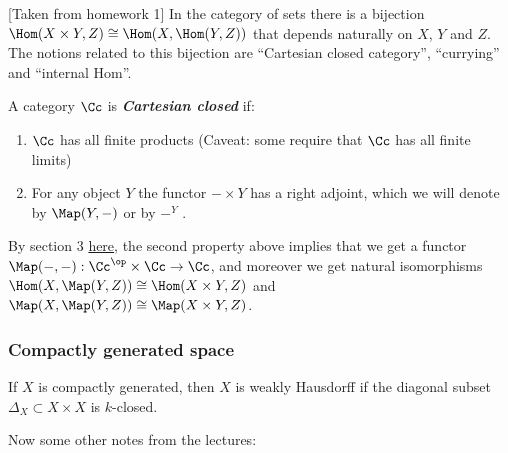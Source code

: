 [Taken from homework 1]
	In the category of sets there is a bijection $\Hom(X\times Y, Z)\cong \Hom(X, \Hom(Y, Z))$ that depends naturally on $X$, $Y$ and $Z$. The notions related to this bijection are “Cartesian closed category”, “currying” and “internal Hom”.
\begin{defn}
	A category $\Cc$ is \textbf{\textit{Cartesian closed}} if:
	\begin{enumerate}
		\item $\Cc$ has all finite products (Caveat: some require that $\Cc$ has all finite limits)
		\item For any object $Y$ the functor $- \times Y$ has a right adjoint, which we will denote by $\Map(Y,-)$ or by $-^Y$ .
	\end{enumerate}
\end{defn}
\begin{remark}
	By section 3 \href{https://ncatlab.org/nlab/show/internal+hom }{here}, the second property above implies that we get a functor $\Map(-,-) : \Cc^{\op} \times \Cc \to \Cc$, and moreover we get natural isomorphisms $\Hom(X, \Map(Y, Z)) \cong \Hom(X \times Y, Z)$ and $\Map(X, \Map(Y, Z))\cong \Map(X \times Y, Z)$.
\end{remark}

\subsubsection{Compactly generated space}

\begin{claim}
		If $X$ is compactly generated, then $X$ is weakly Hausdorff if the diagonal subset $\Delta_X\subset X\times X$ is {\color{orange}$k$-closed}.
\end{claim}
	 Now some other notes from the lectures:
	
